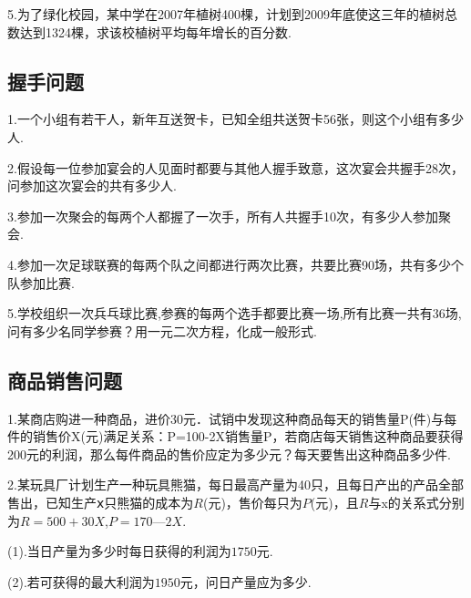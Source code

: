 5.为了绿化校园，某中学在2007年植树400棵，计划到2009年底使这三年的植树总数达到1324棵，求该校植树平均每年增长的百分数.\par
\vspace{2cm}

\subsection{握手问题}
1.一个小组有若干人，新年互送贺卡，已知全组共送贺卡56张，则这个小组有多少人.\par
\vspace{2cm}

2.假设每一位参加宴会的人见面时都要与其他人握手致意，这次宴会共握手28次，问参加这次宴会的共有多少人.\par
\vspace{2cm}

3.参加一次聚会的每两个人都握了一次手，所有人共握手10次，有多少人参加聚会.\par
\vspace{2cm}

4.参加一次足球联赛的每两个队之间都进行两次比赛，共要比赛90场，共有多少个队参加比赛.\par
\vspace{2cm}

5.学校组织一次兵乓球比赛,参赛的每两个选手都要比赛一场,所有比赛一共有36场,问有多少名同学参赛？用一元二次方程，化成一般形式.\par
\vspace{2cm}

\subsection{商品销售问题}
1.某商店购进一种商品，进价30元．试销中发现这种商品每天的销售量P(件)与每件的销售价X(元)满足关系：P=100-2X销售量P，若商店每天销售这种商品要获得200元的利润，那么每件商品的售价应定为多少元？每天要售出这种商品多少件.\par
\vspace{2cm}

2.某玩具厂计划生产一种玩具熊猫，每日最高产量为40只，且每日产出的产品全部售出，已知生产$ⅹ$只熊猫的成本为$R$(元)，售价每只为$P$(元)，且$R$与x的关系式分别为$R=500+30X$,$P=170—2X$.\par

(1).当日产量为多少时每日获得的利润为$1750$元.\par
\vspace{2cm}

(2).若可获得的最大利润为$1950$元，问日产量应为多少.\par
\vspace{2cm}

